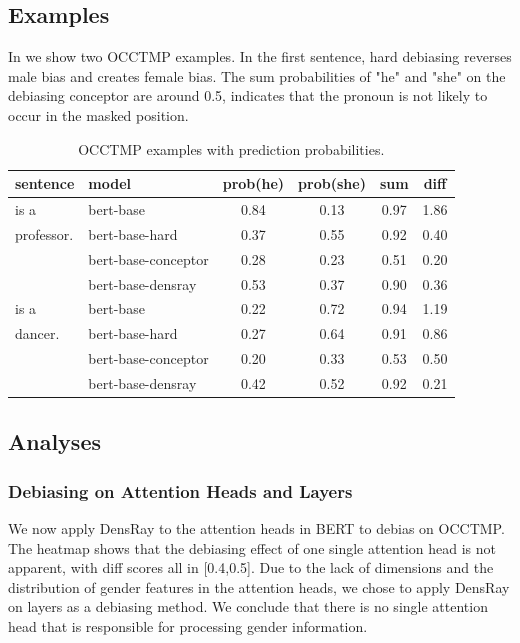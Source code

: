 \subsection{Examples}
In  we show two OCCTMP examples. In the first sentence, hard debiasing reverses male bias and creates female bias. The sum probabilities of "he" and "she" on the debiasing conceptor are around 0.5, indicates that the pronoun is not likely to occur in the masked position.
\begin{table}[h]
	\centering
	\footnotesize
	\begin{tabular}{llcccc}
		\hline
		sentence & model & prob(he) & prob(she) &sum&diff\\
		\hline
		[MASK] is a & bert-base & 0.84 & 0.13&0.97&1.86\\
		professor.& bert-base-hard& 0.37 & 0.55&0.92&0.40\\
		& bert-base-conceptor& 0.28 & 0.23&0.51&{0.20}\\
		& bert-base-densray & 0.53 & 0.37&0.90&0.36\\
		\hline
		[MASK] is a & bert-base & 0.22 & 0.72&0.94&1.19\\
		dancer.  & bert-base-hard& 0.27 & 0.64&0.91&0.86\\
		& bert-base-conceptor& 0.20 & 0.33&0.53&0.50\\
		& bert-base-densray& 0.42 & 0.52&0.92&0.21\\
		\hline
	\end{tabular}
	\caption{
		OCCTMP examples with prediction probabilities.}
\end{table}


\subsection{Analyses}

\subsubsection{Debiasing on Attention Heads and Layers}
We now apply DensRay to the attention heads in BERT to debias on OCCTMP. The heatmap  shows that the debiasing effect of one single attention head is not apparent, with diff scores all in [0.4,0.5]. Due to the lack of dimensions and the distribution of gender features in the attention heads, we chose to apply DensRay on layers as a debiasing method. We conclude that there is no single attention head that is responsible for processing gender information.

